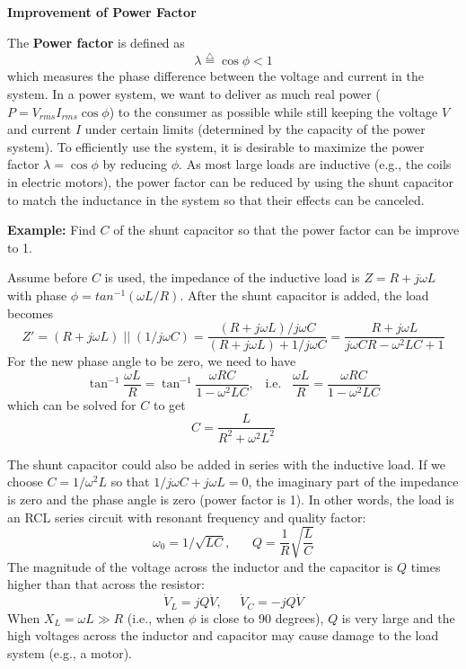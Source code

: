 
{\bf Improvement of Power Factor}

The {\bf Power factor} is defined as
\[	\lambda\stackrel{\triangle}{=}\cos \phi < 1	\]
which measures the phase difference between the voltage and current in
the system. In a power system, we want to deliver as much real power 
($P=V_{rms}I_{rms} \cos\phi$) to the consumer as possible while still 
keeping the voltage $V$ and current $I$ under certain limits (determined 
by the capacity of the power system). To efficiently use the system, it
is desirable to maximize the power factor $\lambda=\cos\phi$ by reducing
$\phi$. As most large loads are inductive (e.g., the coils in electric
motors), the power factor can be reduced by using the shunt capacitor 
to match the inductance in the system so that their effects can be 
canceled.


{\bf Example: } Find $C$ of the shunt capacitor so that the power
factor can be improve to 1.

Assume before $C$ is used, the impedance of the inductive load is
$Z=R+j\omega L$ with phase $\phi=tan^{-1} (\omega L/R)$. After the
shunt capacitor is added, the load becomes 
\[	Z'=(R+j\omega L)\; || \;(1/j\omega C)
	=\frac{(R+j\omega L)/j\omega C}{(R+j\omega L)+1/j\omega C}
	=\frac{R+j\omega L}{j\omega CR-\omega^2 LC+1}	\]
For the new phase angle to be zero, we need to have
\[ \tan^{-1}\frac{\omega L}{R}=\tan^{-1}\frac{\omega RC}{1-\omega^2 LC},
	\;\;\;\mbox{i.e.}\;\;\;	
	\frac{\omega L}{R}=\frac{\omega RC}{1-\omega^2 LC}	\]
which can be solved for $C$ to get
\[	C=\frac{L}{R^2+\omega^2 L^2}	\]

The shunt capacitor could also be added in series with the inductive 
load. If we choose $C=1/\omega^2L$ so that $1/j\omega C+j\omega L=0$, 
the imaginary part of the impedance is zero and the phase angle is zero
(power factor is 1). In other words, the load is an RCL series circuit
with resonant frequency and quality factor:
\[	\omega_0=1/\sqrt{LC},\;\;\;\;\;\;Q=\frac{1}{R}\sqrt{\frac{L}{C}} \]
The magnitude of the voltage across the inductor and the capacitor is $Q$
times higher than that across the resistor:
\[	\dot{V}_L=jQ\dot{V},\;\;\;\;\;\dot{V}_C=-jQ\dot{V}	\]
When $X_L=\omega L \gg R$ (i.e., when $\phi$ is close to 90 degrees), $Q$
is very large and the high voltages across the inductor and capacitor may
cause damage to the load system (e.g., a motor). 

